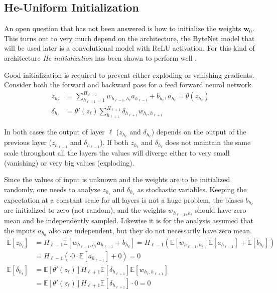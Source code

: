 \subsection{He-Uniform Initialization}

An open question that has not been answered is how to initialize the weights $\mathbf{w}_0$. This turns out to very much depend on the architecture, the ByteNet model that will be used later is a convolutional model with ReLU activation. For this kind of architecture \textit{He initialization} has been shown to perform well \cite{he-initialization}. 

Good initialization is required to prevent either exploding or vanishing gradients. Consider both the forward and backward pass for a feed forward neural network.
\begin{equation}
\begin{aligned}
z_{h_\ell} &= \sum_{h_{\ell-1} = 1}^{H_{\ell-1}} w_{h_{\ell-1}, h_{\ell}} a_{h_{\ell-1}} + b_{h_{\ell}}, a_{h_\ell} = \theta(z_{h_\ell}) \\
\delta_{h_\ell} &= \theta'(z_\ell) \sum_{h_{\ell+1}}^{H_{\ell+1}} \delta_{h_{\ell+1}} w_{h_\ell, h_{\ell+1}}
\end{aligned}
\end{equation}

In both cases the output of layer $\ell$ ($z_{h_\ell}$ and $\delta_{h_\ell}$) depends on the output of the previous layer ($z_{h_{\ell-1}}$ and $\delta_{h_{\ell-1}}$). If both $z_{h_\ell}$ and $\delta_{h_\ell}$ does not maintain the same scale throughout all the layers the values will diverge either to very small (vanishing) or very big values (exploding).

Since the values of input is unknown and the weights are to be initialized randomly, one needs to analyze $z_{h_\ell}$ and $\delta_{h_\ell}$ as stochastic variables. Keeping the expectation at a constant scale for all layers is not a huge problem, the biases $b_{h_\ell}$ are initialized to zero (not random), and the weights $w_{h_{\ell-1}, h_\ell}$ should have zero mean and be independently sampled. Likewise it is for the analysis assumed that the inputs $a_{h_0}$ also are independent, but they do not necessarily have zero mean.
\begin{equation}
\begin{aligned}
\mathbb{E}[z_{h_\ell}]
&= H_{\ell-1} \mathbb{E}[w_{h_{\ell-1}, h_{\ell}} a_{h_{\ell-1}} + b_{h_\ell}] = H_{\ell-1} \left(\mathbb{E}[w_{h_{\ell-1}, h_{\ell}}] \mathbb{E}[a_{h_{\ell-1}}] + \mathbb{E}[b_{h_\ell}]\right) \\
&= H_{\ell-1}\left(\cdot 0 \cdot \mathbb{E}[a_{h_{\ell-1}}] + 0\right) = 0 \\
\mathbb{E}[\delta_{h_\ell}] &= \mathbb{E}[\theta'(z_\ell)] H_{\ell + 1} \mathbb{E}[\delta_{h_{\ell+1}}] \mathbb{E}[w_{h_\ell, h_{\ell+1}}] \\
&= \mathbb{E}[\theta'(z_\ell)] H_{\ell + 1} \mathbb{E}[\delta_{h_{\ell+1}}] \cdot 0 = 0
\end{aligned}
\end{equation}

